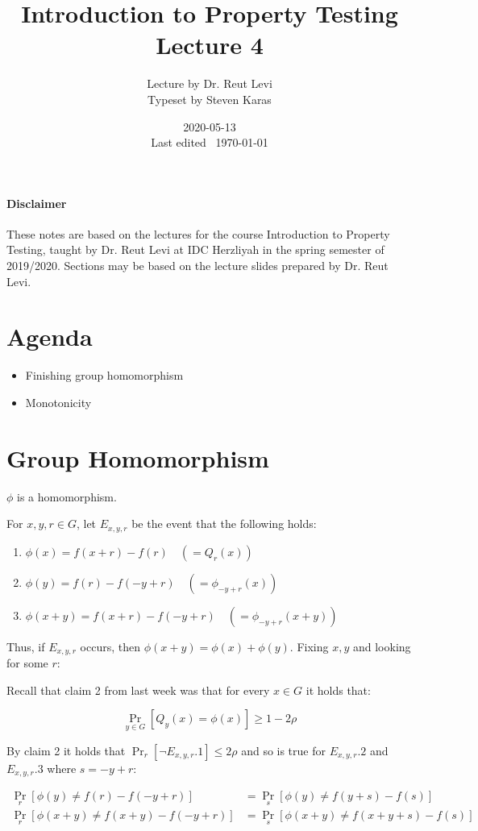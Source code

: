 \documentclass{idc_msc}
\title{Introduction to Property Testing \\\large Lecture 4}
\date{2020-05-13 \\ Last edited \currenttime\ \today}
\author{Lecture by Dr. Reut Levi\\Typeset by Steven Karas}
\begin{document}
\nocite{goldreich2017introduction}

\paragraph{Disclaimer}

These notes are based on the lectures for the course Introduction to Property Testing, taught by Dr. Reut Levi at IDC Herzliyah in the spring semester of 2019/2020.
Sections may be based on the lecture slides prepared by Dr. Reut Levi.

\section{Agenda}

  \begin{itemize}
    \item Finishing group homomorphism
    \item Monotonicity
  \end{itemize}


\section{Group Homomorphism}

\(\phi\) is a homomorphism.

For \(x, y, r \in G\), let \(E_{x,y,r}\) be the event that the following holds:

\begin{enumerate}
  \item \(\phi(x) = f(x+r) - f(r) \quad( = Q_r(x))\)
  \item \(\phi(y) = f(r) - f(-y+r) \quad (= \phi_{-y+r}(x))\)
  \item \(\phi(x+y) = f(x+r) - f(-y+r) \quad (=\phi_{-y+r}(x+y))\)
\end{enumerate}

Thus, if \(E_{x,y,r}\) occurs, then \(\phi(x+y) = \phi(x) + \phi(y)\).
Fixing \(x, y\) and looking for some \(r\):

Recall that claim 2 from last week was that for every \(x \in G\) it holds that:

\[
  \Pr_{y \in G} \left[Q_y(x) = \phi(x)\right] \ge 1 - 2\rho
\]

By claim 2 it holds that \(\Pr_{r} [\lnot E_{x,y,r}.1] \le 2\rho\) and so is true for \(E_{x,y,r}.2\) and \(E_{x,y,r}.3\) where \(s = -y + r\):

\[
  \begin{aligned}
  \Pr_r [\phi(y) \ne f(r) - f(-y+r)] &= \Pr_s [ \phi(y) \ne f(y + s) - f(s)] \\
  \Pr_r [\phi(x + y) \ne f(x+y) - f(-y+r)] &= \Pr_s [ \phi(x +y) \ne f(x + y + s) - f(s)]
  \end{aligned}
\]
\end{document}

